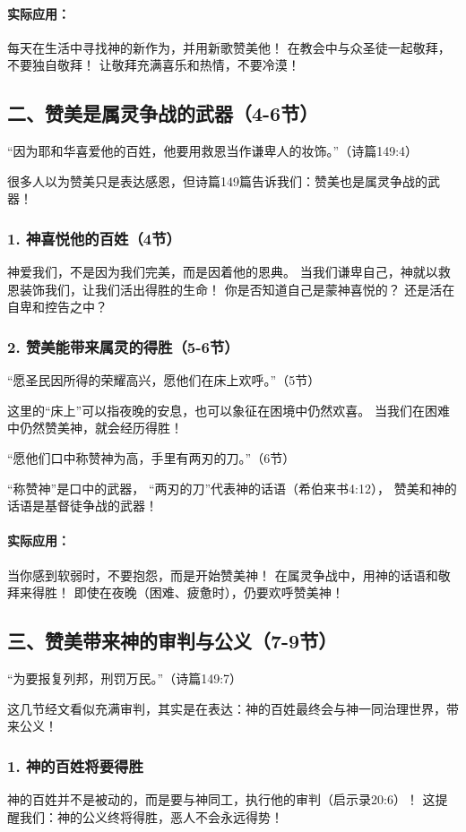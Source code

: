 \documentclass[a4paper, 12pt]{article}
\begin{document}
\paragraph*{实际应用：}
每天在生活中寻找神的新作为，并用新歌赞美他！
在教会中与众圣徒一起敬拜，不要独自敬拜！
让敬拜充满喜乐和热情，不要冷漠！
\subsection*{二、赞美是属灵争战的武器（4-6节）}
“因为耶和华喜爱他的百姓，他要用救恩当作谦卑人的妆饰。”（诗篇149:4）

很多人以为赞美只是表达感恩，但诗篇149篇告诉我们：赞美也是属灵争战的武器！

\subsubsection*{1. 神喜悦他的百姓（4节）}
神爱我们，不是因为我们完美，而是因着他的恩典。
当我们谦卑自己，神就以救恩装饰我们，让我们活出得胜的生命！
你是否知道自己是蒙神喜悦的？ 还是活在自卑和控告之中？
\subsubsection*{2. 赞美能带来属灵的得胜（5-6节）}
\hspace{0.4cm}“愿圣民因所得的荣耀高兴，愿他们在床上欢呼。”（5节）

这里的“床上”可以指夜晚的安息，也可以象征在困境中仍然欢喜。
当我们在困难中仍然赞美神，就会经历得胜！

“愿他们口中称赞神为高，手里有两刃的刀。”（6节）

“称赞神”是口中的武器，
“两刃的刀”代表神的话语（希伯来书4:12），
赞美和神的话语是基督徒争战的武器！

\paragraph*{实际应用：}
当你感到软弱时，不要抱怨，而是开始赞美神！
在属灵争战中，用神的话语和敬拜来得胜！
即使在夜晚（困难、疲惫时），仍要欢呼赞美神！
\subsection*{三、赞美带来神的审判与公义（7-9节）}
“为要报复列邦，刑罚万民。”（诗篇149:7）

这几节经文看似充满审判，其实是在表达：神的百姓最终会与神一同治理世界，带来公义！

\subsubsection*{1. 神的百姓将要得胜}
神的百姓并不是被动的，而是要与神同工，执行他的审判（启示录20:6）！
这提醒我们：神的公义终将得胜，恶人不会永远得势！
\end{document}
